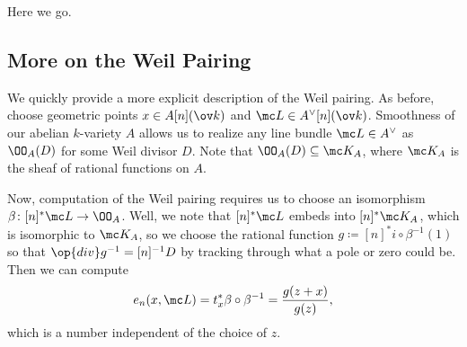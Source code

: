 \documentclass[../notes.tex]{subfiles}
\begin{document}
Here we go.

\subsection{More on the Weil Pairing}
We quickly provide a more explicit description of the Weil pairing. As before, choose geometric points $x\in A[n](\ov k)$ and $\mc L\in A^\lor[n](\ov k)$. Smoothness of our abelian $k$-variety $A$ allows us to realize any line bundle $\mc L\in A^\lor$ as $\OO_A(D)$ for some Weil divisor $D$. Note that $\OO_A(D)\subseteq\mc K_A$, where $\mc K_A$ is the sheaf of rational functions on $A$.

Now, computation of the Weil pairing requires us to choose an isomorphism $\beta\colon[n]^*\mc L\to\OO_A$. Well, we note that $[n]^*\mc L$ embeds into $[n]^*\mc K_A$, which is isomorphic to $\mc K_A$, so we choose the rational function $g\coloneqq[n]^*i\circ\beta^{-1}(1)$ so that $\op{div}g^{-1}=[n]^{-1}D$ by tracking through what a pole or zero could be. Then we can compute
\[e_n(x,\mc L)=t_x^*\beta\circ\beta^{-1}=\frac{g(z+x)}{g(z)},\]
which is a number independent of the choice of $z$.
\end{document}
